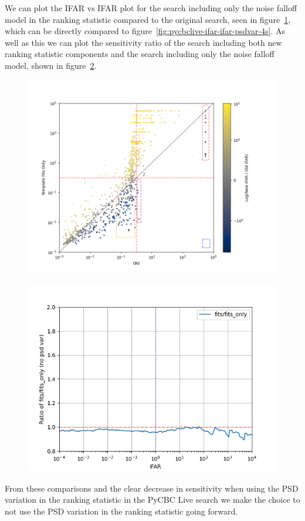 We can plot the IFAR vs IFAR plot for the search including only the noise falloff model in the ranking statistic compared to the original search, seen in figure~\ref{fig:pycbclive-ifar-ifar-fits-only-4s}, which can be directly compared to figure~\ref{fig:pycbclive-ifar-ifar-psdvar-4s}. As well as this we can plot the sensitivity ratio of the search including both new ranking statistic components and the search including only the noise falloff model, shown in figure~\ref{fig:pycbclive-vt-ratio-f-fo}.
%
\begin{figure}
       \centering
    \includegraphics[width=1.0\textwidth]{images/5_pycbclive/fits_only_4s_ifar_vs_ifar_regions.png}
    \caption{}
    \label{fig:pycbclive-ifar-ifar-fits-only-4s}
\end{figure}
%
\begin{figure}
       \centering
    \includegraphics[width=1.0\textwidth]{images/5_pycbclive/f_vs_fo.png}
    \caption{}
    \label{fig:pycbclive-vt-ratio-f-fo}
\end{figure}
%
From these comparisons and the clear decrease in sensitivity when using the PSD variation in the ranking statistic in the PyCBC Live search we make the choice to not use the PSD variation in the ranking statistic going forward.

